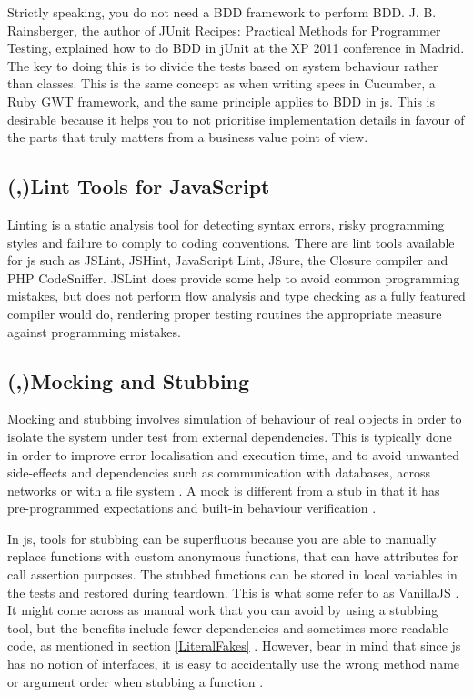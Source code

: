\documentclass[11pt]{article}
\begin{document}
Strictly speaking, you do not need a BDD framework to perform BDD. J. B. Rainsberger, the author of JUnit Recipes: Practical Methods for Programmer Testing, explained how to do BDD in jUnit at the XP 2011 conference in Madrid. The key to doing this is to divide the tests based on system behaviour rather than classes. This is the same concept as when writing specs in Cucumber, a Ruby GWT framework, and the same principle applies to BDD in \gls{js}. This is desirable because it helps you to not prioritise implementation details in favour of the parts that truly matters from a business value point of view.\cite[question~20]{Ahnve}

\subsection{(,)Lint Tools for JavaScript}
\label{subsec:Lint}

Linting is a static analysis tool for detecting syntax errors, risky programming styles and failure to comply to coding conventions. There are lint tools available for \gls{js} such as JSLint, JSHint, JavaScript Lint, JSure, the Closure compiler and PHP CodeSniffer. JSLint does provide some help to avoid common programming mistakes, but does not perform flow analysis \cite{JSLint} and type checking as a fully featured compiler would do, rendering proper testing routines the appropriate measure against programming mistakes.

\subsection{(,)Mocking and Stubbing}
\label{subsec:mocking}

Mocking and stubbing involves simulation of behaviour of real objects in order to isolate the system under test from external dependencies. This is typically done in order to improve error localisation and execution time, and to avoid unwanted side-effects and dependencies such as communication with databases, across networks or with a file system \cite[ch.~2]{Legacy}. A mock is different from a stub in that it has pre-programmed expectations and built-in behaviour verification \cite[p.~453]{Tddjs}.

In \gls{js}, tools for stubbing can be superfluous because you are able to manually replace functions with custom anonymous functions, that can have attributes for call assertion purposes. The stubbed functions can be stored in local variables in the tests and restored during teardown. This is what some refer to as VanillaJS \cite[question~53]{Edelstam}. It might come across as manual work that you can avoid by using a stubbing tool, but the benefits include fewer dependencies and sometimes more readable code, as mentioned in section \ref{LiteralFakes} \cite[questions~54-55]{Edelstam}. However, bear in mind that since \gls{js} has no notion of interfaces, it is easy to accidentally use the wrong method name or argument order when stubbing a function \cite[p.~471]{Tddjs}.
\end{document}
